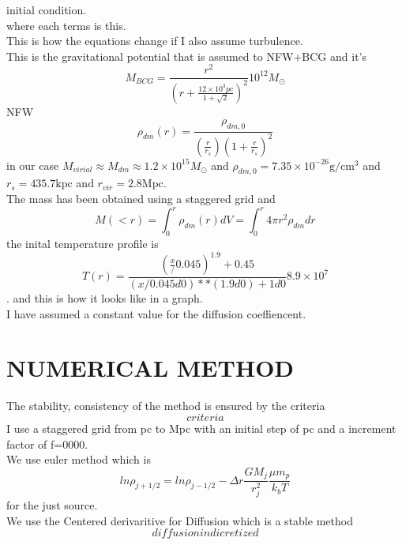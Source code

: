 \documentclass{article}
\numberwithin{equation}{subsection}
\begin{document}
initial condition.\\
where each terms is this.\\
This is how the equations change if I also assume turbulence.\\
This is the gravitational potential that is assumed 
to NFW+BCG and it's 
\begin{equation}
    M_{BCG}=\frac{r^2}{(r+\frac{12\times 10^3 pc}{1+\sqrt{2}})^2}10^{12}M_{\odot}
\end{equation}
NFW
\begin{equation}
    \rho _{dm}(r)=\frac{\rho _{dm,0}}{(\frac{r}{r_s})(1+\frac{r}{r_s})^2}
\end{equation}
in our case $M_{virial}\approx M_{dm} \approx 1.2 \times 10^{15} M_{\odot}$ 
and $\rho _{dm,0}=7.35\times 10 ^{-26} \mathrm{g/cm^3}$ 
and $r_s=435.7 \mathrm{kpc}$ and $r_{vir}=2.8 \mathrm{Mpc}$.\\
The mass has been obtained using a staggered grid and 
\begin{equation}
    M(<r)=\int_{0}^{r}\rho_{dm}(r) dV= \int_{0}^{r}4 \pi r^2 \rho _{dm} dr
\end{equation}
the inital temperature profile is 
\begin{equation}
    T(r)=\frac{(\frac{x}/{0.045})^{1.9}+0.45}{(x/0.045d0)**(1.9d0)+1d0}  8.9\times 10^7
\end{equation}.
and this is how it looks like in a graph.\\
I have assumed a constant value for the diffusion coeffiencent.


\section{NUMERICAL METHOD}
The stability, consistency of the method is ensured 
by the criteria
\begin{equation}
    criteria
\end{equation}
I use a staggered grid from pc to Mpc with an initial 
step of pc and a increment factor of f=0000.\\
We use euler method which is 
\begin{equation}
    ln\rho_{j+1/2}=ln\rho_{j-1/2}-\Delta r \frac{G M_j}{r_j^2}\frac{\mu m_p}{k_b T}
\end{equation}
for the just source.\\
We use the Centered derivaritive for Diffusion 
which is a stable method
\begin{equation}
    diffusion in dicretized
\end{equation}
\end{document}
